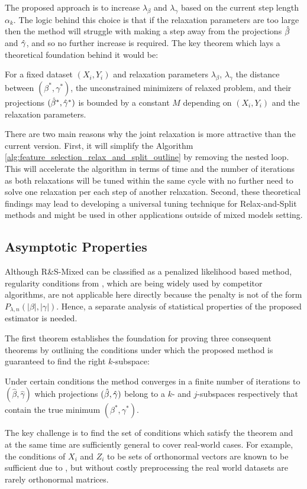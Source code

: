 \documentclass[11pt,letterpaper]{article}
\newcommand{\ouralgo}{R\&S-Mixed }
\numberwithin{equation}{section} %
\numberwithin{figure}{section} %
\numberwithin{table}{section} %
\begin{document}
The proposed approach is to increase $\lambda_\beta$ and $\lambda_\gamma$ based on the current step length $\alpha_k$. The logic behind this choice is that if the relaxation parameters are too large then the method will struggle with making a step away from the projections $\hat\beta$ and $\hat\gamma$, and so no further increase is required. The key theorem which lays a theoretical foundation behind it would be:
\begin{theorem}
\label{thm:distance_between_minima}
	For a fixed dataset $(X_i, Y_i)$ and relaxation parameters $\lambda_\beta$, $\lambda_\gamma$ the distance between $(\beta^*, \gamma^*)$, the unconstrained minimizers of relaxed problem, and their projections $(\hat\beta^*, \hat\gamma^*)$ is bounded by a constant $M$ depending on $(X_i, Y_i)$ and the relaxation parameters.
\end{theorem}

There are two main reasons why the joint relaxation is more attractive than the current version. First, it will simplify the Algorithm \ref{alg:feature_selection_relax_and_split_outline} by removing the nested loop. This will accelerate the algorithm in terms of time and the number of iterations as both relaxations will be tuned within the same cycle with no further need to solve one relaxation per each step of another relaxation. Second, these theoretical findings may lead to developing a universal tuning technique for Relax-and-Split methods and might be used in other applications outside of mixed models setting.

\subsection{Asymptotic Properties}

Although \ouralgo can be classified as a penalized likelihood based method, regularity conditions from \cite{Fan2001}, which are being widely used by competitor algorithms, are not applicable here directly because the penalty is not of the form $P_{\lambda, n}(|\beta|, |\gamma|)$. Hence, a separate analysis of statistical properties of the proposed estimator is needed. 


The first theorem establishes the foundation for proving three consequent theorems by outlining the conditions under which the proposed method is guaranteed to find the right $k$-subspace:

\begin{theorem}
	Under certain conditions the method converges in a finite number of iterations to $(\hat\beta, \hat\gamma)$ which projections $(\hat\beta, \hat\gamma)$ belong to a $k$- and $j$-subspaces respectively that contain the true minimum $(\beta^*,\gamma^*)$.
\end{theorem}
The key challenge is to find the set of conditions which satisfy the theorem and at the same time are sufficiently general to cover real-world cases. For example, the conditions of $X_i$ and $Z_i$ to be sets of orthonormal vectors are known to be sufficient due to \cite{Tibshirani1996}, but without costly preprocessing the real world datasets are rarely orthonormal matrices.
\end{document}
